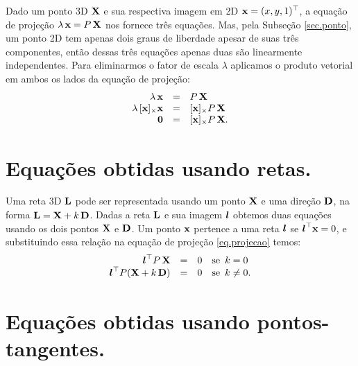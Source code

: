 Dado um ponto 3D $\mathbf{X}$ e sua respectiva imagem em 2D $\mathbf{x}=(x,y,1)^\top$, a equação de projeção $\lambda\,\mathbf{x}=P\,\mathbf{X}$ nos fornece três equações. Mas, pela Subseção \ref{sec.ponto}, um ponto 2D tem apenas dois graus de liberdade apesar de suas três componentes, então dessas três equações apenas duas são linearmente independentes. Para eliminarmos o fator de escala $\lambda$ aplicamos o produto vetorial em ambos os lados da equação de projeção:
\begin{equation}\label{eq.astrom-pontos}
\begin{array}{rcl}
\lambda\,\mathbf{x}&=&P\,\mathbf{X}\\
\lambda\,[\mathbf{x}]_\times\mathbf{x}&=&[\mathbf{x}]_\times P\,\mathbf{X}\\
{\bf 0}&=&[\mathbf{x}]_\times P\,\mathbf{X}.
\end{array}
\end{equation}
\section*{Equações obtidas usando retas.} 

Uma reta 3D ${\bf L}$ pode ser representada usando um ponto $\mathbf{X}$ e uma direção ${\bf D}$, na forma ${\bf L}=\mathbf{X}+k\,{\bf D}$. Dadas a reta ${\bf L}$ e sua imagem $\boldsymbol{l}$ obtemos duas equações usando os dois pontos $\mathbf{X}$ e ${\bf D}$. Um ponto $\mathbf{x}$ pertence a uma reta $\boldsymbol{l}$ se $\boldsymbol{l}^\top\mathbf{x}=0$, e substituindo essa relação na equação de projeção \ref{eq.projecao} temos:
\begin{equation}\label{eq.astrom-retas}
\begin{array}{rcll}
\boldsymbol{l}^\top P\,\mathbf{X}&=&0&\text{se}\,\,\,k=0\\
\boldsymbol{l}^\top P(\mathbf{X}+k\,{\bf D})&=&0&\text{se}\,\,\,k\neq0.
\end{array}
\end{equation}  
\section*{Equações obtidas usando pontos-tangentes.}

